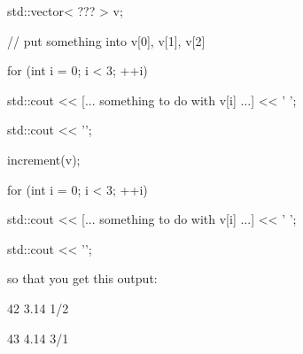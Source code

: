 


\begin{console}

std::vector< ??? > v;

// put something into v[0], v[1], v[2]



for (int i = 0; i < 3; ++i)

{   

    std::cout << [... something to do with v[i] ...] << ' ';

}

std::cout << '\n';

increment(v);

for (int i = 0; i < 3; ++i)

{   

    std::cout << [... something to do with v[i] ...] << ' ';

}

std::cout << '\n';

\end{console}



so that you get this output:



\begin{console}

42 3.14 1/2

43 4.14 3/1

\end{console}

